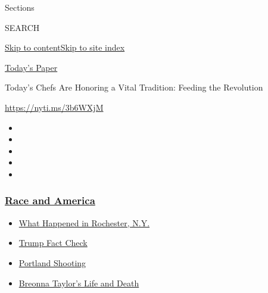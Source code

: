 Sections

SEARCH

\protect\hyperlink{site-content}{Skip to
content}\protect\hyperlink{site-index}{Skip to site index}

\href{https://myaccount.nytimes3xbfgragh.onion/auth/login?response_type=cookie\&client_id=vi}{}

\href{https://www.nytimes3xbfgragh.onion/section/todayspaper}{Today's
Paper}

Today's Chefs Are Honoring a Vital Tradition: Feeding the Revolution

\url{https://nyti.ms/3b6WXjM}

\begin{itemize}
\item
\item
\item
\item
\item
\end{itemize}

\hypertarget{race-and-america}{%
\subsubsection{\texorpdfstring{\href{https://www.nytimes3xbfgragh.onion/news-event/george-floyd-protests-minneapolis-new-york-los-angeles?name=styln-george-floyd\&region=TOP_BANNER\&block=storyline_menu_recirc\&action=click\&pgtype=Article\&impression_id=635b5c60-f287-11ea-96c9-f92c07a4cad0\&variant=undefined}{Race
and America}}{Race and America}}\label{race-and-america}}

\begin{itemize}
\tightlist
\item
  \href{https://www.nytimes3xbfgragh.onion/2020/09/04/nyregion/rochester-police-daniel-prude.html?name=styln-george-floyd\&region=TOP_BANNER\&block=storyline_menu_recirc\&action=click\&pgtype=Article\&impression_id=635b5c61-f287-11ea-96c9-f92c07a4cad0\&variant=undefined}{What
  Happened in Rochester, N.Y.}
\item
  \href{https://www.nytimes3xbfgragh.onion/2020/09/01/us/politics/trump-fact-check-protests.html?name=styln-george-floyd\&region=TOP_BANNER\&block=storyline_menu_recirc\&action=click\&pgtype=Article\&impression_id=635b5c62-f287-11ea-96c9-f92c07a4cad0\&variant=undefined}{Trump
  Fact Check}
\item
  \href{https://www.nytimes3xbfgragh.onion/2020/08/30/us/portland-shooting-explained.html?name=styln-george-floyd\&region=TOP_BANNER\&block=storyline_menu_recirc\&action=click\&pgtype=Article\&impression_id=635b8370-f287-11ea-96c9-f92c07a4cad0\&variant=undefined}{Portland
  Shooting}
\item
  \href{https://www.nytimes3xbfgragh.onion/2020/08/30/us/breonna-taylor-police-killing.html?name=styln-george-floyd\&region=TOP_BANNER\&block=storyline_menu_recirc\&action=click\&pgtype=Article\&impression_id=635b8371-f287-11ea-96c9-f92c07a4cad0\&variant=undefined}{Breonna
  Taylor's Life and Death}
\end{itemize}

